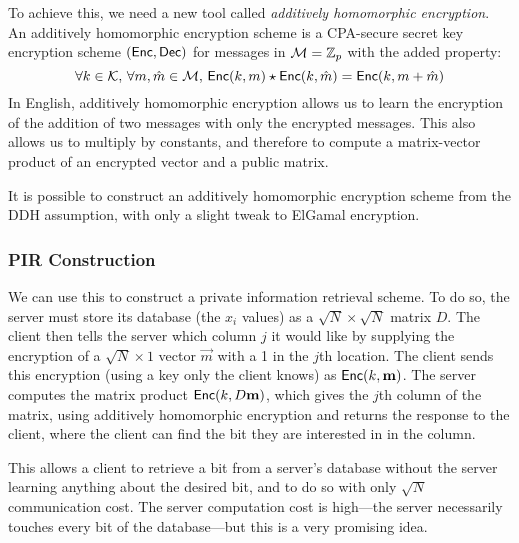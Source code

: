 To achieve this, we need a new tool called \emph{additively homomorphic encryption}. An additively homomorphic encryption scheme is a CPA-secure secret key encryption scheme $(\mathsf{Enc}, \mathsf{Dec})$ for messages in $\mathcal{M} = \mathbb{Z}_p$ with the added property:
\[ \forall k \in \mathcal{K},\, \forall m, \hat{m} \in \mathcal{M},\, \mathsf{Enc}(k, m) \star \mathsf{Enc}(k, \hat{m}) = \mathsf{Enc}(k, m + \hat{m}) \]
In English, additively homomorphic encryption allows us to learn the encryption of the addition of two messages with only the encrypted messages. This also allows us to multiply by constants, and therefore to compute a matrix-vector product of an encrypted vector and a public matrix.

It is possible to construct an additively homomorphic encryption scheme from the DDH assumption, with only a slight tweak to ElGamal encryption.

\subsubsection{PIR Construction}
We can use this to construct a private information retrieval scheme. To do so, the server must store its database (the $x_i$ values) as a $\sqrt{N} \times \sqrt{N}$ matrix $D$. The client then tells the server which column $j$ it would like by supplying the encryption of a $\sqrt{N} \times 1$ vector $\vec{m}$ with a 1 in the $j$th location. The client sends this encryption (using a key only the client knows) as $\mathsf{Enc}(k, \mathbf{m})$. The server computes the matrix product $\mathsf{Enc}(k, D\mathbf{m})$, which gives the $j$th column of the matrix, using additively homomorphic encryption and returns the response to the client, where the client can find the bit they are interested in in the column. 

This allows a client to retrieve a bit from a server's database without the server learning anything about the desired bit, and to do so with only $\sqrt{N}$ communication cost. The server computation cost is high---the server necessarily touches every bit of the database---but this is a very promising idea.

